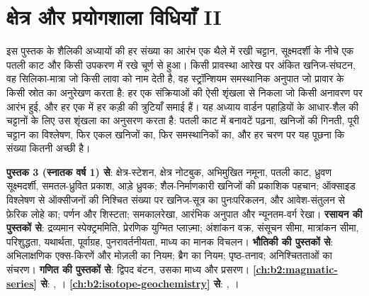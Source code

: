 \chapter{क्षेत्र और प्रयोगशाला विधियाँ II}\label{ch:b2:field-lab-methods-2}

इस पुस्तक के शैलिकी अध्यायों की हर संख्या का आरंभ एक थैले में रखी चट्टान, सूक्ष्मदर्शी के नीचे एक पतली काट
और किसी उपकरण में रखे चूर्ण से हुआ। किसी प्रावस्था आरेख पर अंकित खनिज-संघटन, वह सिलिका-मात्रा जो
किसी लावा को नाम देती है, वह स्ट्रॉन्शियम समस्थानिक अनुपात जो प्रावार के किसी स्रोत का अनुरेखण करता है:
हर एक संक्रियाओं की ऐसी शृंखला से निकला जो किसी अनावरण पर आरंभ हुई, और हर एक में हर कड़ी की
त्रुटियाँ समाई हैं। यह अध्याय वार्डन पहाड़ियों के आधार-शैल की चट्टानों के लिए उस शृंखला का अनुसरण करता है:
पतली काट में बनावटें पढ़ना, खनिजों की गिनती, पूरी चट्टान का विश्लेषण, फिर एकल खनिजों का, फिर समस्थानिकों का,
और हर चरण पर यह पूछना कि संख्या कितनी अच्छी है।

\begin{recall}
\textbf{पुस्तक 3 (स्नातक वर्ष 1) से}: क्षेत्र-स्टेशन, क्षेत्र नोटबुक, अभिमुखित नमूना, पतली काट,
ध्रुवण सूक्ष्मदर्शी, समतल-ध्रुवित प्रकाश, आड़े ध्रुवक; शैल-निर्माणकारी खनिजों की प्रकाशिक
पहचान; ऑक्साइड विश्लेषण से ऑक्सीजनों की निश्चित संख्या पर खनिज-सूत्र का पुनःपरिकलन,
और आवेश-संतुलन से फ़ेरिक लोहे का; पर्णन और शिस्टता; समकालरेखा, आरंभिक अनुपात और
न्यूनतम-वर्ग रेखा। \textbf{रसायन की पुस्तकों से}: द्रव्यमान स्पेक्ट्रममिति, प्रेरणिक युग्मित प्लाज़्मा;
अंशांकन वक्र, संसूचन सीमा, मात्रांकन सीमा, परिशुद्धता, यथार्थता, पूर्वाग्रह,
पुनरावर्तनीयता, माध्य का मानक विचलन। \textbf{भौतिकी की पुस्तकों से}: अभिलाक्षणिक एक्स-किरणें
और मोज़ली का नियम; ब्रैग का नियम; पृष्ठ-तनाव; अनिश्चितताओं का संचरण।
\textbf{गणित की पुस्तकों से}: द्विपद बंटन, उसका माध्य और प्रसरण।
\textbf{\cref{ch:b2:magmatic-series} से}: , ।
\textbf{\cref{ch:b2:isotope-geochemistry} से}: , ।
\end{recall}

